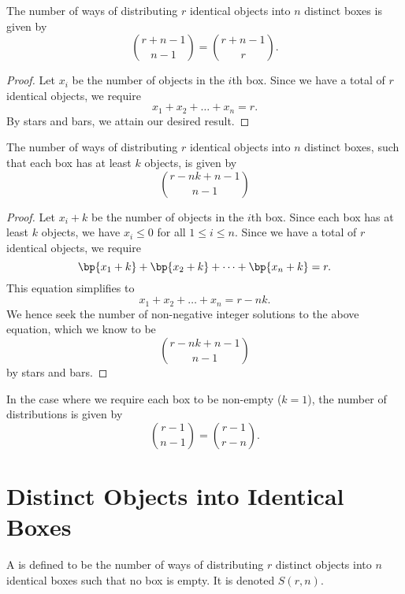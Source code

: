 \begin{proposition}
    The number of ways of distributing $r$ identical objects into $n$ distinct boxes is given by \[\binom{r + n - 1}{n - 1} = \binom{r + n - 1}{r}.\]
\end{proposition}
\begin{proof}
    Let $x_i$ be the number of objects in the $i$th box. Since we have a total of $r$ identical objects, we require \[x_1 + x_2 + \dots + x_n = r.\] By stars and bars, we attain our desired result.
\end{proof}

\begin{proposition}
    The number of ways of distributing $r$ identical objects into $n$ distinct boxes, such that each box has at least $k$ objects, is given by \[\binom{r-nk + n - 1}{n - 1}\]
\end{proposition}
\begin{proof}
    Let $x_i + k$ be the number of objects in the $i$th box. Since each box has at least $k$ objects, we have $x_i \leq 0$ for all $1 \leq i \leq n$. Since we have a total of $r$ identical objects, we require \[\bp{x_1 + k} + \bp{x_2 + k} + \dots + \bp{x_n + k} = r.\] This equation simplifies to \[x_1 + x_2 + \dots + x_n = r - nk.\] We hence seek the number of non-negative integer solutions to the above equation, which we know to be \[\binom{r-nk + n - 1}{n - 1}\] by stars and bars.
\end{proof}

\begin{corollary}
    In the case where we require each box to be non-empty ($k = 1$), the number of distributions is given by \[\binom{r - 1}{n - 1} = \binom{r - 1}{r - n}.\]
\end{corollary}

\section{Distinct Objects into Identical Boxes}

\begin{definition}
    A  is defined to be the number of ways of distributing $r$ distinct objects into $n$ identical boxes such that no box is empty. It is denoted $S(r, n)$.
\end{definition}

